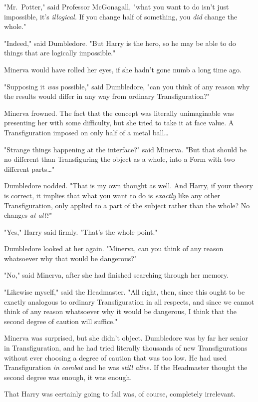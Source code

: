 "Mr.~Potter," said Professor McGonagall, "what you want to do isn't just 
impossible, it's \emph{illogical.} If you change half of something, you 
\emph{did} change the whole."

"Indeed," said Dumbledore. "But Harry is the hero, so he may be able to do 
things that are logically impossible."

Minerva would have rolled her eyes, if she hadn't gone numb a long time ago.

"Supposing it \emph{was} possible," said Dumbledore, "can you think of any 
reason why the results would differ in any way from ordinary Transfiguration?"

Minerva frowned. The fact that the concept was literally unimaginable was 
presenting her with some difficulty, but she tried to take it at face value. A 
Transfiguration imposed on only half of a metal ball{\ldots}

"Strange things happening at the interface?" said Minerva. "But that should be 
no different than Transfiguring the object as a whole, into a Form with two 
different parts{\ldots}"

Dumbledore nodded. "That is my own thought as well. And Harry, if your theory 
is correct, it implies that what you want to do is \emph{exactly} like any 
other Transfiguration, only applied to a part of the subject rather than the 
whole? No changes \emph{at all?}"

"Yes," Harry said firmly. "That's the whole point."

Dumbledore looked at her again. "Minerva, can you think of any reason 
whatsoever why that would be dangerous?"

"No," said Minerva, after she had finished searching through her memory.

"Likewise myself," said the Headmaster. "All right, then, since this ought to 
be exactly analogous to ordinary Transfiguration in all respects, and since we 
cannot think of any reason whatsoever why it would be dangerous, I think that 
the second degree of caution will suffice."

Minerva was surprised, but she didn't object. Dumbledore was by far her senior 
in Transfiguration, and he had tried literally thousands of new 
Transfigurations without ever choosing a degree of caution that was too low. He 
had used Transfiguration \emph{in combat} and he was \emph{still alive.} If the 
Headmaster thought the second degree was enough, it was enough.

That Harry was certainly going to fail was, of course, completely irrelevant.

